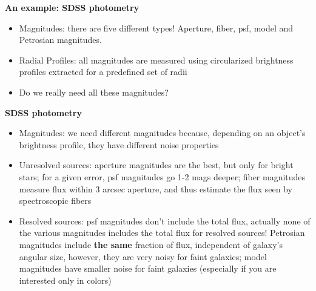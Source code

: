 \documentclass[letterpaper,landscape]{slides}
\begin{document}






\begin{slide}
\begin{center}
\bfseries
{\large {\color{red} An example: SDSS photometry}}
\end{center}
\vskip 0.6in

\begin{itemize}
\item {\color{blue} Magnitudes:} there are five different types! Aperture,
         fiber, psf, model and Petrosian magnitudes.   
 \item {\color{blue} Radial Profiles:} all magnitudes are measured 
        using circularized brightness profiles extracted for a predefined 
        set of radii
\item {\color{red} Do we really need all these magnitudes?} 
\end{itemize}

\end{slide}
 





\begin{slide}
\begin{center}
\bfseries
{\large {\color{red} SDSS photometry}}
\end{center}
\vskip 0.6in

\begin{itemize}
\item {\color{blue} Magnitudes:} we need different magnitudes because, depending
     on an object's brightness profile, they have different noise properties
 \item {\color{blue} Unresolved sources:} {\color{red} aperture magnitudes} are the best, but 
       only for bright stars; for a given error, {\color{red} psf magnitudes} go 1-2 mags deeper; 
      {\color{red} fiber magnitudes} measure flux within 3 arcsec aperture, and thus estimate 
       the flux seen by spectroscopic fibers
\item {\color{blue} Resolved sources:} psf magnitudes don't include the total 
      flux, actually none of the various magnitudes includes the total flux
      for resolved sources! {\color{red} Petrosian magnitudes} include {\bf the same} 
      fraction of flux, independent of galaxy's angular size, however, they are
      very noisy for faint galaxies; {\color{red} model magnitudes} have smaller noise for
      faint galaxies (especially if you are interested only in colors)
\end{itemize}

\end{slide}
 
\end{document}
